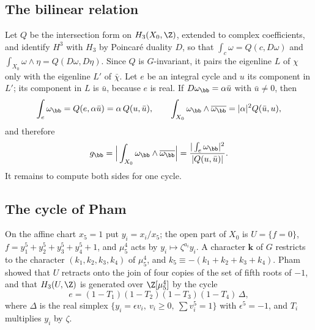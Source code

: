 \subsection{The bilinear relation}

Let $Q$ be the intersection form on $H_3(X_0,\Z)$, extended to complex
coefficients, and identify $H^3$ with $H_3$ by Poincar\'e duality $D$, so
that $\int_c\omega=Q(c,D\omega)$ and $\int_{X_0}\omega\wedge\eta=
Q(D\omega,D\eta)$. Since $Q$ is $G$-invariant, it pairs the eigenline $L$ of
$\chi$ only with the eigenline $L'$ of $\bar\chi$. Let $e$ be an integral
cycle and $u$ its component in $L'$; its component in $L$ is $\bar u$,
because $e$ is real. If $D\omega_{\bb}=\alpha\bar u$ with $\bar u\ne0$, then
\[
\int_e\omega_{\bb}=Q(e,\alpha\bar u)=\alpha\,Q(u,\bar u),\qquad
\int_{X_0}\omega_{\bb}\wedge\overline{\omega_{\bb}}=|\alpha|^2Q(\bar u,u),
\]
and therefore
\begin{equation}\label{eq:bilinear}
g_{\bb}=\Big|\int_{X_0}\omega_{\bb}\wedge\overline{\omega_{\bb}}\Big|
=\frac{|\int_e\omega_{\bb}|^2}{|Q(u,\bar u)|}.
\end{equation}
It remains to compute both sides for one cycle.

\subsection{The cycle of Pham}

On the affine chart $x_5=1$ put $y_i=x_i/x_5$; the open part of $X_0$ is
$U=\{f=0\}$, $f=y_1^5+y_2^5+y_3^5+y_4^5+1$, and $\mu_5^4$ acts by
$y_i\mapsto\zeta^{a_i}y_i$. A character $\mathbf k$ of $G$ restricts to the
character $(k_1,k_2,k_3,k_4)$ of $\mu_5^4$, and $k_5\equiv-(k_1+k_2+k_3+
k_4)$. Pham~\cite{Pha65} showed that $U$ retracts onto the join of four
copies of the set of fifth roots of $-1$, and that $H_3(U,\Z)$ is generated
over $\Z[\mu_5^4]$ by the cycle
\[
e=(1-T_1)(1-T_2)(1-T_3)(1-T_4)\,\Delta,
\]
where $\Delta$ is the real simplex $\{y_i=\epsilon v_i,\ v_i\ge0,\
\sum v_i^5=1\}$ with $\epsilon^5=-1$, and $T_i$ multiplies $y_i$ by
$\zeta$.

